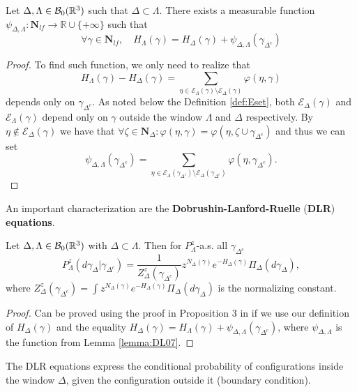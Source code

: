 \begin{lemma}\label{lemma:DL07}
	Let $\Delta,\Lambda \in \mathcal B_0({\mathbb R^3})$ such that $\Delta \subset \Lambda$. There exists a measurable function $\psi_{\Delta,\Lambda}:\mathbf N_{lf}\to \mathbb R\cup\{+\infty\}$ such that
	$$\forall \gamma \in \mathbf N_{lf},\quad H_\Lambda(\gamma) = H_\Delta(\gamma) + \psi_{\Delta,\Lambda}(\gamma_{\Delta^c})$$
\end{lemma}
\begin{proof}
	To find such function, we only need to realize that
	$$H_\Lambda(\gamma) - H_\Delta(\gamma) = \sum_{\eta \in \mathcal E_\Lambda(\gamma) \setminus \mathcal E_\Delta(\gamma)} \varphi(\eta,\gamma)$$
	depends only on $\gamma_{\Delta^c}$. As noted below the Definition \ref{def:Eset}, both $\mathcal E_\Delta(\gamma)$ and $\mathcal E_\Lambda(\gamma)$ depend only on $\gamma$ outside the window $\Lambda$ and $\Delta$ respectively. By $\eta \notin \mathcal E_{\Delta}(\gamma)$ we have that $\forall \zeta \in \mathbf N_\Delta: \varphi(\eta,\gamma)=\varphi(\eta,\zeta \cup \gamma_{\Delta^c})$ and thus we can set
	$$\psi_{\Delta,\Lambda}(\gamma_{\Delta^c}) = \sum_{\eta \in \mathcal E_\Lambda(\gamma_{\Delta^c}) \setminus \mathcal E_\Delta(\gamma_{\Delta^c})} \varphi(\eta,\gamma_{\Delta^c}).$$
\end{proof}

An important characterization are the \textbf{Dobrushin-Lanford-Ruelle} (\textbf{DLR}) \textbf{equations}.

\begin{proposition}
	Let $\Delta,\Lambda\in \mathcal B_0({\mathbb R^3})$ with $\Delta \subset \Lambda$. Then for $P^z_{\Lambda}$-a.s. all $\gamma_{\Delta^c}$
	$$P^z_{\Lambda}(d\gamma_\Delta|\gamma_{\Delta^c}) = \frac 1{Z^z_\Delta(\gamma_{\Delta^c})} z^{N_\Delta(\gamma)} e^{-H_\Delta(\gamma)} \Pi_\Delta (d\gamma_\Delta),$$
		where $Z^z_{\Delta}(\gamma_{\Delta^c}) = \int z^{N_\Delta(\gamma)} e^{-H_\Delta(\gamma)} \Pi_\Delta(d\gamma_\Delta)$ is the normalizing constant. 
\end{proposition}
\begin{proof}
	Can be proved using the proof in Proposition $3$ in \cite{Dereudre2017} if we use our definition of $H_\Delta(\gamma)$ and the equality $H_\Delta(\gamma) = H_\Lambda(\gamma) + \psi_{\Delta,\Lambda}(\gamma_{\Delta^c})$, where 
	$\psi_{\Delta,\Lambda}$ is the function from Lemma \ref{lemma:DL07}.
\end{proof}

The DLR equations express the conditional probability of configurations inside the window $\Delta$, given the configuration outside it (boundary condition).

